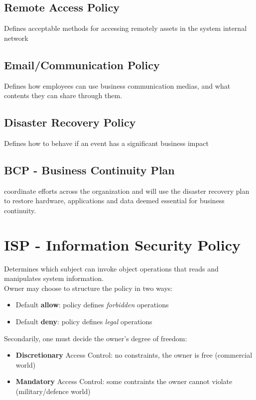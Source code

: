 \subsection{Remote Access Policy}
Defines acceptable methods for accessing remotely assets in the system internal network
\subsection{Email/Communication Policy}
Defines how employees can use business communication medias, and what contents they can share through them.
\subsection{Disaster Recovery Policy}
Defines how to behave if an event has a significant business impact
\subsection{BCP - Business Continuity Plan}
coordinate efforts across the organization and will use
the disaster recovery plan to restore hardware, applications
and data deemed essential for business continuity.

\section{ISP - Information Security Policy}
\label{sec:information_security_policy}
Determines which subject can invoke object operations that reads and manipulates system information.\\
Owner may choose to structure the policy in two ways:
\begin{itemize}
    \item Default \textbf{allow}: policy defines \textit{forbidden} operations
    \item Default \textbf{deny}: policy defines \textit{legal} operations
\end{itemize}
Secondarily, one must decide the owner's degree of freedom:
\begin{itemize}
    \item \textbf{Discretionary} Access Control: no constraints, the owner is free (commercial world)
    \item \textbf{Mandatory} Access Control: some contraints the owner cannot violate (military/defence world)
\end{itemize}

